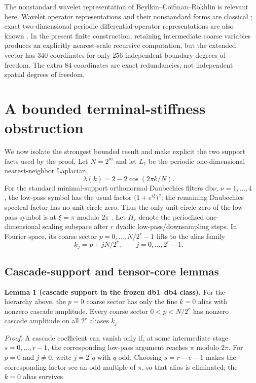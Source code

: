 \documentclass[11pt,a4paper]{article}
\begin{document}
The nonstandard wavelet representation of Beylkin--Coifman--Rokhlin is relevant here. Wavelet operator representations and their nonstandard forms are classical \cite{bcr1991,beylkin1992}; exact two-dimensional periodic differential-operator representations are also known \cite{wavelet2d2004}. In the present finite construction, retaining intermediate coarse variables produces an explicitly nearest-scale recursive computation, but the extended vector has 340 coordinates for only 256 independent boundary degrees of freedom. The extra 84 coordinates are exact redundancies, not independent spatial degrees of freedom.

\section{A bounded terminal-stiffness obstruction}
We now isolate the strongest bounded result and make explicit the two support facts used by the proof. Let $N=2^m$ and let $L_1$ be the periodic one-dimensional nearest-neighbor Laplacian,
\begin{equation}
\lambda(k)=2-2\cos(2\pi k/N).
\end{equation}
For the standard minimal-support orthonormal Daubechies filters db$\nu$, $\nu=1,\ldots,4$, the low-pass symbol has the usual factor $\bigl(1+e^{i\xi}\bigr)^\nu$; the remaining Daubechies spectral factor has no unit-circle zero. Thus the only unit-circle zero of the low-pass symbol is at $\xi=\pi$ modulo $2\pi$ \cite{daubechies1988,beylkin1992}. Let $H_r$ denote the periodized one-dimensional scaling subspace after $r$ dyadic low-pass/downsampling steps. In Fourier space, its coarse sector $p=0,\ldots,N/2^r-1$ lifts to the alias family
\begin{equation}
k_j=p+jN/2^r,\qquad j=0,\ldots,2^r-1.
\end{equation}

\subsection{Cascade-support and tensor-core lemmas}
\textbf{Lemma 1 (cascade support in the frozen db1--db4 class).}
For the hierarchy above, the $p=0$ coarse sector has only the fine $k=0$ alias with nonzero cascade amplitude. Every coarse sector $0<p<N/2^r$ has nonzero cascade amplitude on all $2^r$ aliases $k_j$.

\textit{Proof.}
A cascade coefficient can vanish only if, at some intermediate stage $s=0,\ldots,r-1$, the corresponding low-pass argument reaches $\pi$ modulo $2\pi$. For $p=0$ and $j\ne0$, write $j=2^v q$ with $q$ odd. Choosing $s=r-v-1$ makes the corresponding factor see an odd multiple of $\pi$, so that alias is eliminated; the $k=0$ alias survives.
\end{document}
